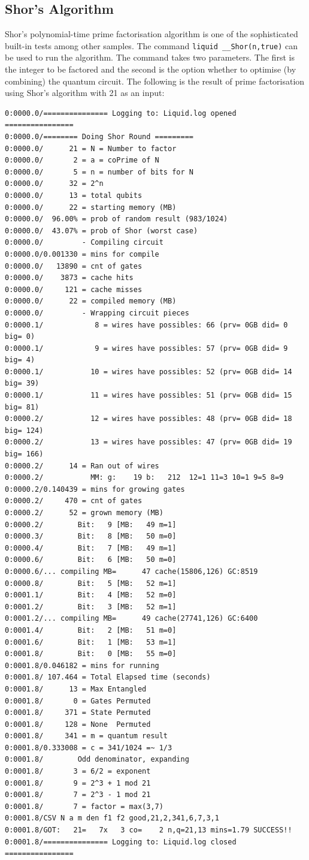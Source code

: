\documentclass[12pt]{third-rep}
\begin{document}
\subsection{Shor's Algorithm}
Shor's polynomial-time prime factorisation algorithm is one of the sophisticated built-in tests among other samples. The command \texttt{liquid \_\_Shor(n,true)} can be used to run the algorithm. The command takes two parameters. The first is the integer to be factored and the second is the option whether to optimise (by combining) the quantum circuit. The following is the result of prime factorisation using Shor's algorithm with 21 as an input:
\begin{verbatim}
0:0000.0/=============== Logging to: Liquid.log opened ================
0:0000.0/======== Doing Shor Round =========
0:0000.0/      21 = N = Number to factor
0:0000.0/       2 = a = coPrime of N
0:0000.0/       5 = n = number of bits for N
0:0000.0/      32 = 2^n
0:0000.0/      13 = total qubits
0:0000.0/      22 = starting memory (MB)
0:0000.0/  96.00% = prob of random result (983/1024)
0:0000.0/  43.07% = prob of Shor (worst case)
0:0000.0/         - Compiling circuit
0:0000.0/0.001330 = mins for compile
0:0000.0/   13890 = cnt of gates
0:0000.0/    3873 = cache hits
0:0000.0/     121 = cache misses
0:0000.0/      22 = compiled memory (MB)
0:0000.0/         - Wrapping circuit pieces
0:0000.1/            8 = wires have possibles: 66 (prv= 0GB did= 0 big= 0)
0:0000.1/            9 = wires have possibles: 57 (prv= 0GB did= 9 big= 4)
0:0000.1/           10 = wires have possibles: 52 (prv= 0GB did= 14 big= 39)
0:0000.1/           11 = wires have possibles: 51 (prv= 0GB did= 15 big= 81)
0:0000.2/           12 = wires have possibles: 48 (prv= 0GB did= 18 big= 124)
0:0000.2/           13 = wires have possibles: 47 (prv= 0GB did= 19 big= 166)
0:0000.2/      14 = Ran out of wires
0:0000.2/           MM: g:    19 b:   212  12=1 11=3 10=1 9=5 8=9
0:0000.2/0.140439 = mins for growing gates
0:0000.2/     470 = cnt of gates
0:0000.2/      52 = grown memory (MB)
0:0000.2/        Bit:   9 [MB:   49 m=1]
0:0000.3/        Bit:   8 [MB:   50 m=0]
0:0000.4/        Bit:   7 [MB:   49 m=1]
0:0000.6/        Bit:   6 [MB:   50 m=0]
0:0000.6/... compiling MB=      47 cache(15806,126) GC:8519
0:0000.8/        Bit:   5 [MB:   52 m=1]
0:0001.1/        Bit:   4 [MB:   52 m=0]
0:0001.2/        Bit:   3 [MB:   52 m=1]
0:0001.2/... compiling MB=      49 cache(27741,126) GC:6400
0:0001.4/        Bit:   2 [MB:   51 m=0]
0:0001.6/        Bit:   1 [MB:   53 m=1]
0:0001.8/        Bit:   0 [MB:   55 m=0]
0:0001.8/0.046182 = mins for running
0:0001.8/ 107.464 = Total Elapsed time (seconds)
0:0001.8/      13 = Max Entangled
0:0001.8/       0 = Gates Permuted
0:0001.8/     371 = State Permuted
0:0001.8/     128 = None  Permuted
0:0001.8/     341 = m = quantum result
0:0001.8/0.333008 = c = 341/1024 =~ 1/3
0:0001.8/        Odd denominator, expanding
0:0001.8/       3 = 6/2 = exponent
0:0001.8/       9 = 2^3 + 1 mod 21
0:0001.8/       7 = 2^3 - 1 mod 21
0:0001.8/       7 = factor = max(3,7)
0:0001.8/CSV N a m den f1 f2 good,21,2,341,6,7,3,1
0:0001.8/GOT:   21=   7x   3 co=    2 n,q=21,13 mins=1.79 SUCCESS!!
0:0001.8/=============== Logging to: Liquid.log closed ================
\end{verbatim}
\end{document}

